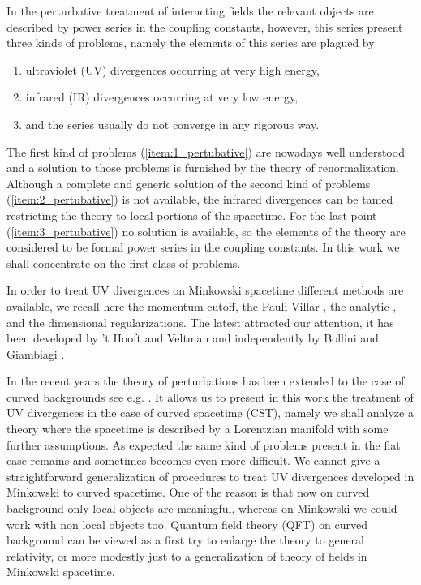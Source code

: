 \documentclass[11pt]{book}
\theoremstyle{break}
\begin{document}
In the perturbative treatment of interacting fields the relevant objects are described by power series in the coupling constants, however, this series present three kinds of problems, namely the elements of this series are plagued by
%
\begin{enumerate}
\item\label{item:1_pertubative} ultraviolet (UV) divergences occurring at very high energy,
%
\item\label{item:2_pertubative} infrared (IR) divergences occurring at very low energy,
%
\item\label{item:3_pertubative} and the series usually do not converge in any rigorous way.
\end{enumerate}
%
The first kind of problems (\ref{item:1_pertubative}) are nowadays well understood and a solution to those problems is furnished by the theory of renormalization. Although a complete and generic solution of the second kind of problems (\ref{item:2_pertubative}) is not available, the infrared divergences can be tamed restricting the theory to local portions of the spacetime. For the last point (\ref{item:3_pertubative}) no solution is available, so the elements of the theory are considered to be formal power series in the coupling constants. In this work we shall concentrate on the first class of problems.\par%


In order to treat UV divergences on Minkowski spacetime different methods are available, we recall here the momentum cutoff, the Pauli Villar \cite{PV_1949}, the analytic \cite{SPEER_1968}, and the dimensional regularizations. The latest attracted our attention, it has been developed by 't Hooft and Veltman \cite{THV_1972} and independently by Bollini and Giambiagi \cite{BG_1972}.\par%


In the recent years the theory of perturbations has been extended to the case of curved backgrounds see e.g. \cite{BF_2000}. It allows us to present in this work the treatment of UV divergences in the case of curved spacetime (CST), namely we shall analyze a theory where the spacetime is described by a Lorentzian manifold with some further assumptions. As expected the same kind of problems present in the flat case remains and sometimes becomes even more difficult. We cannot give a straightforward generalization of procedures to treat UV divergences developed in Minkowski to curved spacetime. One of the reason is that now on curved background only local objects are meaningful, whereas on Minkowski we could work with non local objects too. Quantum field theory (QFT) on curved background can be viewed as a first try to enlarge the theory to general relativity, or more modestly just to a generalization of theory of fields in Minkowski spacetime.\par%
\end{document}
